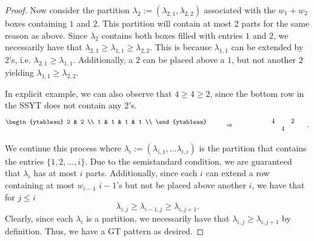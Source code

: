 \documentclass[10pt]{article}
\theoremstyle{plain}
\theoremstyle{definition}
\newcommand{\Rar}{\Rightarrow}
\begin{document}
\begin{proof}
Now consider the partition $\lambda_2 := (\lambda_{2,1}, \lambda_{2,2})$ associated with the $w_1 + w_2$ boxes containing $1$ and $2$. This partition will contain at most 2 parts for the same reason as above. Since $\lambda_2$ contains both boxes filled with entries $1$ and $2$, we necessarily have that $\lambda_{2,1} \geq \lambda_{1,1} \geq \lambda_{2,2}$. This is because $\lambda_{1,1}$ can be extended by $2$'s, i.e. $\lambda_{2,1} \geq \lambda_{1,1}$. Additionally, a $2$ can be placed above a $1$, but not another $2$ yielding $\lambda_{1,1} \geq \lambda_{2,2}$. 

In explicit example, we can also observe that $4 \geq 4 \geq 2$, since the bottom row in the SSYT does not contain any 2's. 
\[
\begin{ytableau}
2 & 2   \\ 
1 & 1 & 1 & 1 \\ 
\end{ytableau} \quad\qquad \raisebox{-5pt}{$\Rar$} \qquad\qquad \raisebox{-5pt}{$\begin{matrix}
& & 4 & & 2 & & \\ 
& & & 4 & & & 
\end{matrix}$.}
\]

We continue this process where $\lambda_i := (\lambda_{i,1}, \dots \lambda_{i,i})$ is the partition that contains the entries $\{1, 2, \dots, i\}$. Due to the semistandard condition, we are guaranteed that $\lambda_i$ has at most $i$ parts. Additionally, since each $i$ can extend a row containing at most $w_{i-1}$ $i-1$'s but not be placed above another $i$, we have that for $j \leq i$
\[
\lambda_{i,j} \geq \lambda_{i-1,j} \geq \lambda_{i,j+1}.
\]
Clearly, since each $\lambda_i$ is a partition, we necessarily have that $\lambda_{i,j} \geq \lambda_{i,j+1}$ by definition. Thus, we have a GT pattern as desired. 


\end{proof}
\end{document}
